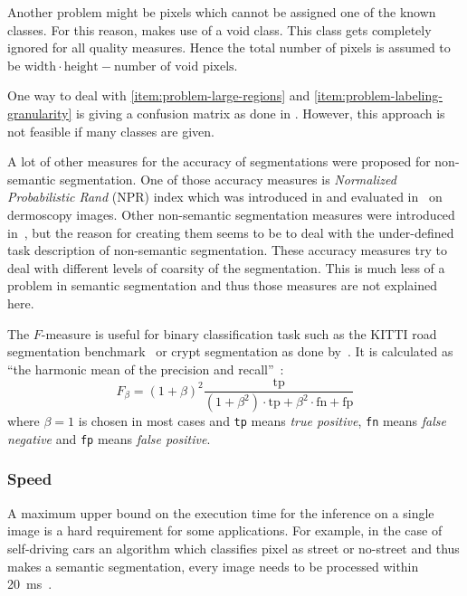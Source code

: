 Another problem might be pixels which cannot be assigned one of the known
classes. For this reason, \cite{shotton2006textonboost} makes use of a void
class. This class gets completely ignored for all quality measures. Hence the
total number of pixels is assumed to be $\text{width} \cdot \text{height} - \text{number of void pixels}$.

One way to deal with \cref{item:problem-large-regions} and
\cref{item:problem-labeling-granularity} is giving a confusion matrix as
done in \cite{shotton2006textonboost}. However, this approach is not feasible
if many classes are given.


A lot of other measures for the accuracy of segmentations were proposed for
non-semantic segmentation. One of those accuracy measures is \textit{Normalized
Probabilistic Rand} (NPR) index which was introduced in
\cite{unnikrishnan2005measure} and evaluated in~\cite{celebi2009improved}
on dermoscopy images. Other non-semantic segmentation measures were introduced
in~\cite{martin2001database}, but the reason for creating them seems
to be to deal with the under-defined task description of non-semantic
segmentation. These accuracy measures try to deal with different levels of
coarsity of the segmentation. This is much less of a problem in semantic
segmentation and thus those measures are not explained here.

The $F$-measure is useful for binary classification task such as the KITTI road
segmentation benchmark~\cite{Fritsch2013ITSC} or crypt segmentation as done
by~\cite{cohen2015memory}. It is calculated as \enquote{the harmonic mean of
the precision and recall}~\cite{pantofaru2005comparison}:
\[F_\beta = (1+\beta)^2 \frac{\text{tp}}{(1+\beta^2)\cdot \text{tp}+ \beta^2 \cdot \text{fn} + \text{fp}}\]
where $\beta=1$ is chosen in most cases and \texttt{tp} means \textit{true
positive}, \texttt{fn} means \textit{false negative} and  \texttt{fp} means
\textit{false positive}.


\subsubsection{Speed}%
\label{subsubsec:speed-quality-measure}%
A maximum upper bound on the execution time for the inference on a single image
is a hard requirement for some applications. For example, in the case of
self-driving cars an algorithm which classifies pixel as street or no-street
and thus makes a semantic segmentation, every image needs to be processed
within \SI{20}{\milli\second}~\cite{bittel2015pixel}.

